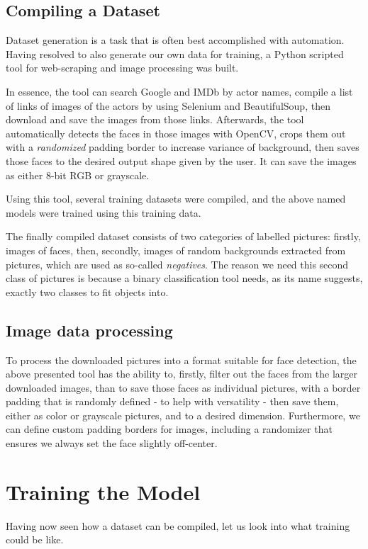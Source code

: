\subsection{Compiling a Dataset}
Dataset generation is a task that is often best accomplished with automation. Having resolved to also generate our own data for training, a Python scripted tool for web-scraping and image processing was built. \par
In essence, the tool can search Google and IMDb by actor names, compile a list of links of images of the actors by using Selenium \cite{selenium_website} and BeautifulSoup, then download and save the images from those links. Afterwards, the tool automatically detects the faces in those images with OpenCV, crops them out with a \textit{randomized} padding border to increase variance of background, then saves those faces to the desired output shape given by the user. It can save the images as either 8-bit RGB or grayscale. \par
Using this tool, several training datasets were compiled, and the above named models were trained using this training data.\par
The finally compiled dataset consists of two categories of labelled pictures: firstly, images of faces, then, secondly, images of random backgrounds extracted from pictures, which are used as so-called \textit{negatives}. The reason we need this second class of pictures is because a binary classification tool needs, as its name suggests, exactly two classes to fit objects into.

\subsection{Image data processing}
To process the downloaded pictures into a format suitable for face detection, the above presented tool has the ability to, firstly, filter out the faces from the larger downloaded images, than to save those faces as individual pictures, with a border padding that is randomly defined - to help with versatility - then save them, either as color or grayscale pictures, and to a desired dimension. Furthermore, we can define custom padding borders for images, including a randomizer that ensures we always set the face slightly off-center.

\section{Training the Model}
Having now seen how a dataset can be compiled, let us look into what training could be like. 
